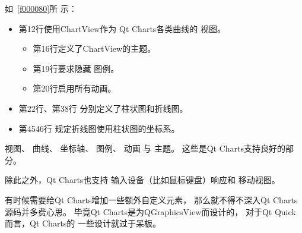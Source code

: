 如\filesourcenumbernameone\ \ref{f000080}所
示：
\begin{itemize}
\item 第12行使用ChartView作为
Qt Charts各类曲线的
视图。
    \begin{itemize}
\item 第16行定义了ChartView的主题。
\item 第19行要求隐藏
图例。
\item 第20行启用所有动画。
    \end{itemize}
\item 第22行、第38行
分别定义了柱状图和折线图。
\item 第45\raisebox{0.16ex}{\sourcefonttwo\~{}}46行
规定折线图使用柱状图的坐标系。

\end{itemize}

视图、
曲线、
坐标轴、
图例、
动画
与
主题。
这些是Qt Charts支持良好的部分。

除此之外，Qt Charts也支持
输入设备（比如鼠标键盘）响应和
移动视图。

有时候需要给Qt Charts增加一些额外自定义元素，
那么就不得不深入Qt Charts源码并多费心思。
毕竟Qt Charts是为QGraphicsView而设计的，
对于Qt Quick而言，Qt Charts的
一些设计就过于呆板。


